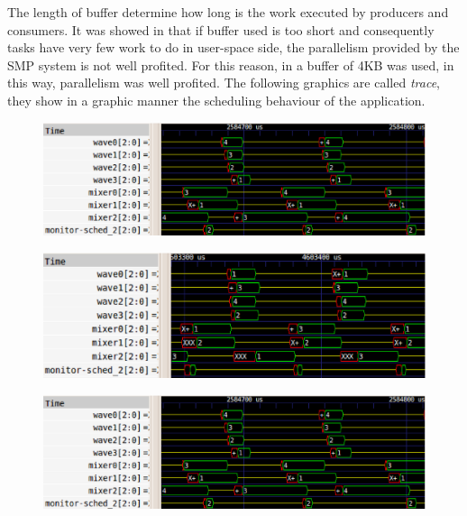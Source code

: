 The length of buffer determine how long is the work executed by producers and consumers. It was showed in \cite{lcs} that if buffer used is too short and 
consequently tasks have very few work to do in user-space side, the parallelism provided by the SMP system is not well profited. For this reason, in 
\cite{lcs} a buffer of 4KB was used, in this way, parallelism was well profited. The following graphics are called \textit{trace}, they show in a graphic 
manner the scheduling behaviour of the application.

\newpage

\begin{figure}[htbp]
\centering
\includegraphics[width=\widefigure]{images/4KB_Xeon.eps}
\caption{}
\label{fig:trace_xeon}
\end{figure}

\begin{figure}[htbp]
\centering
\includegraphics[width=\widefigure]{images/4KB_i7.eps}
\caption{}
\label{fig:trace_i7}
\end{figure}

\begin{figure}[htbp]
\centering
\includegraphics[width=\widefigure]{images/4KB_Xeon.eps}
\caption{}
\label{fig:trace_xeon}
\end{figure}

